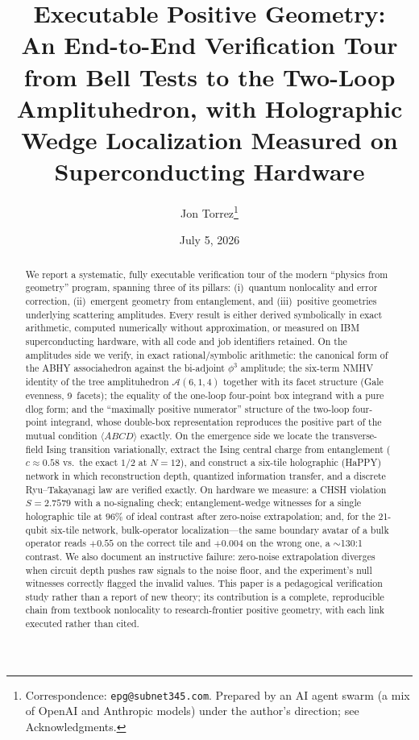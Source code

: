 \documentclass[11pt]{article}
\title{Executable Positive Geometry:\\
An End-to-End Verification Tour from Bell Tests to the Two-Loop
Amplituhedron, with Holographic Wedge Localization Measured on
Superconducting Hardware}
\author{Jon Torrez\thanks{Correspondence: \texttt{epg@subnet345.com}.
Prepared by an AI agent swarm (a mix of OpenAI and Anthropic models) under
the author's direction; see Acknowledgments.}}
\date{July 5, 2026}
\newcommand{\br}[1]{\langle #1 \rangle}
\begin{document}
\maketitle

\begin{abstract}
We report a systematic, fully executable verification tour of the modern
``physics from geometry'' program, spanning three of its pillars:
(i)~quantum nonlocality and error correction, (ii)~emergent geometry from
entanglement, and (iii)~positive geometries underlying scattering
amplitudes. Every result is either derived symbolically in exact
arithmetic, computed numerically without approximation, or measured on IBM
superconducting hardware, with all code and job identifiers retained. On
the amplitudes side we verify, in exact rational/symbolic arithmetic: the
canonical form of the ABHY associahedron against the bi-adjoint $\phi^3$
amplitude; the six-term NMHV identity of the tree amplituhedron
$\mathcal{A}(6,1,4)$ together with its facet structure (Gale evenness,
9~facets); the equality of the one-loop four-point box integrand with a
pure dlog form; and the ``maximally positive numerator'' structure of the
two-loop four-point integrand, whose double-box representation reproduces
the positive part of the mutual condition $\br{ABCD}$ exactly. On the
emergence side we locate the transverse-field Ising transition
variationally, extract the Ising central charge from entanglement
($c \approx 0.58$ vs.\ the exact $1/2$ at $N{=}12$), and construct a
six-tile holographic (HaPPY) network in which reconstruction depth,
quantized information transfer, and a discrete Ryu--Takayanagi law are
verified exactly. On hardware we measure: a CHSH violation
$S = 2.7579$ with a no-signaling check; entanglement-wedge witnesses for a
single holographic tile at $96\%$ of ideal contrast after zero-noise
extrapolation; and, for the 21-qubit six-tile network, bulk-operator
localization---the same boundary avatar of a bulk operator reads
$+0.55$ on the correct tile and $+0.004$ on the wrong one, a
$\sim$130:1 contrast. We also document an instructive failure: zero-noise
extrapolation diverges when circuit depth pushes raw signals to the noise
floor, and the experiment's null witnesses correctly flagged the invalid
values. This paper is a pedagogical verification study rather than a
report of new theory; its contribution is a complete, reproducible chain
from textbook nonlocality to research-frontier positive geometry, with
each link executed rather than cited.
\end{abstract}
\end{document}
